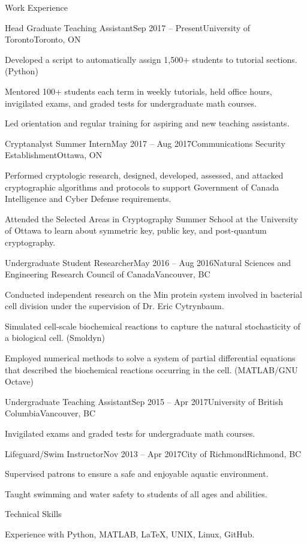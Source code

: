\documentclass{resume}
\begin{document}
\begin{rSection}{Work Experience}

\begin{rSubsection}{Head Graduate Teaching Assistant}{Sep 2017 -- Present}{University of Toronto}{Toronto, ON}
    \item Developed a script to automatically assign 1,500+ students to tutorial sections. (Python)
    \item Mentored 100+ students each term in weekly tutorials, held office hours, invigilated exams, and graded tests for undergraduate math courses.
    \item Led orientation and regular training for aspiring and new teaching assistants.
\end{rSubsection}

\begin{rSubsection}{Cryptanalyst Summer Intern}{May 2017 -- Aug 2017}{Communications Security Establishment}{Ottawa, ON}
    \item Performed cryptologic research, designed, developed, assessed, and attacked cryptographic algorithms and protocols to support Government of Canada Intelligence and Cyber Defense requirements.
    \item Attended the Selected Areas in Cryptography Summer School at the University of Ottawa to learn about symmetric key, public key, and post-quantum cryptography.
\end{rSubsection}

\begin{rSubsection}{Undergraduate Student Researcher}{May 2016 -- Aug 2016}{Natural Sciences and Engineering Research Council of Canada}{Vancouver, BC}
    \item Conducted independent research on the Min protein system involved in bacterial cell division under the supervision of Dr. Eric Cytrynbaum.
    \item Simulated cell-scale biochemical reactions to capture the natural stochasticity of a biological cell. (Smoldyn)
    \item Employed numerical methods to solve a system of partial differential equations that described the biochemical reactions occurring in the cell. (MATLAB/GNU Octave)
\end{rSubsection}

\begin{rSubsection}{Undergraduate Teaching Assistant}{Sep 2015 -- Apr 2017}{University of British Columbia}{Vancouver, BC}
    \item Invigilated exams and graded tests for undergraduate math courses.
\end{rSubsection}

\begin{rSubsection}{Lifeguard/Swim Instructor}{Nov 2013 -- Apr 2017}{City of Richmond}{Richmond, BC}
    \item Supervised patrons to ensure a safe and enjoyable aquatic environment.
    \item Taught swimming and water safety to students of all ages and abilities.
\end{rSubsection}

\end{rSection}

\begin{rSection}{Technical Skills}

{\normalfont Experience with Python, MATLAB, LaTeX, UNIX, Linux, GitHub.}

\end{rSection}
\end{document}
